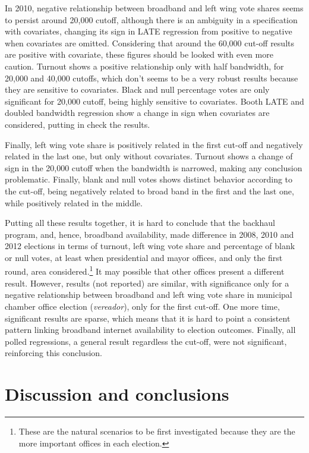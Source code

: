 \documentclass[
  12pt,
]{article}
\begin{document}
In 2010, negative relationship between broadband and left wing vote
shares seems to persist around 20,000 cutoff, although there is an
ambiguity in a specification with covariates, changing its sign in LATE
regression from positive to negative when covariates are omitted.
Considering that around the 60,000 cut-off results are positive with
covariate, these figures should be looked with even more caution.
Turnout shows a positive relationship only with half bandwidth, for
20,000 and 40,000 cutoffs, which don't seems to be a very robust results
because they are sensitive to covariates. Black and null percentage
votes are only significant for 20,000 cutoff, being highly sensitive to
covariates. Booth LATE and doubled bandwidth regression show a change in
sign when covariates are considered, putting in check the results.

Finally, left wing vote share is positively related in the first cut-off
and negatively related in the last one, but only without covariates.
Turnout shows a change of sign in the 20,000 cutoff when the bandwidth
is narrowed, making any conclusion problematic. Finally, blank and null
votes shows distinct behavior according to the cut-off, being negatively
related to broad band in the first and the last one, while positively
related in the middle.

Putting all these results together, it is hard to conclude that the
backhaul program, and, hence, broadband availability, made difference in
2008, 2010 and 2012 elections in terms of turnout, left wing vote share
and percentage of blank or null votes, at least when presidential and
mayor offices, and only the first round, area considered.\footnote{These
  are the natural scenarios to be first investigated because they are
  the more important offices in each election.} It may possible that
other offices present a different result. However, results (not
reported) are similar, with significance only for a negative
relationship between broadband and left wing vote share in municipal
chamber office election (\emph{vereador}), only for the first cut-off.
One more time, significant results are sparse, which means that it is
hard to point a consistent pattern linking broadband internet
availability to election outcomes. Finally, all polled regressions, a
general result regardless the cut-off, were not significant, reinforcing
this conclusion.

\hypertarget{discussion-and-conclusions}{%
\section{Discussion and conclusions}\label{discussion-and-conclusions}}
\end{document}
